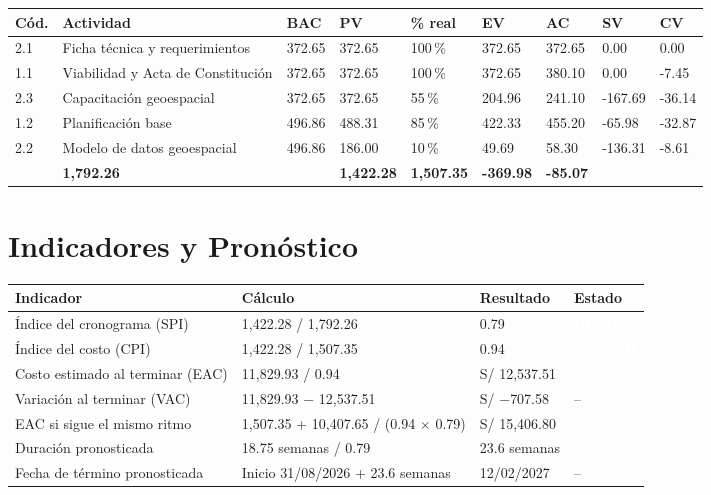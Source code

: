\documentclass[11pt,a4paper]{article}
\newcommand{\etiqueta}[2]{{\setlength{\fboxsep}{2pt}\colorbox{#1}{\textcolor{white}{\scriptsize\bfseries #2}}}}
\begin{document}
\vspace{0.1cm}
{\footnotesize
\setlength{\tabcolsep}{3pt}
\noindent\begin{tabularx}{\textwidth}{@{}C{0.7cm} L Q{1.3cm} Q{1.3cm} C{0.9cm} Q{1.3cm} Q{1.3cm} Q{1.3cm} Q{1.15cm}@{}}
\toprule
{}
\textbf{Cód.} & \textbf{Actividad} & \textbf{BAC} & \textbf{PV} & \textbf{\% real} & \textbf{EV} & \textbf{AC} & \textbf{SV} & \textbf{CV} \\
 & Ficha técnica y requerimientos & 372.65 & 372.65 & 100\,\% & 372.65 & 372.65 & 0.00 & 0.00 \\
1.1 & Viabilidad y Acta de Constitución & 372.65 & 372.65 & 100\,\% & 372.65 & 380.10 & 0.00 & \textcolor{SevAlta}{-7.45} \\
2.3 & Capacitación geoespacial & 372.65 & 372.65 & 55\,\% & 204.96 & 241.10 & \textcolor{SevAlta}{-167.69} & \textcolor{SevAlta}{-36.14} \\
1.2 & Planificación base & 496.86 & 488.31 & 85\,\% & 422.33 & 455.20 & \textcolor{SevAlta}{-65.98} & \textcolor{SevAlta}{-32.87} \\
2.2 & Modelo de datos geoespacial & 496.86 & 186.00 & 10\,\% & 49.69 & 58.30 & \textcolor{SevAlta}{-136.31} & \textcolor{SevAlta}{-8.61} \\
\midrule
{} & \textbf{1,792.26} & & \textbf{1,422.28} & \textbf{1,507.35} & \textbf{\textcolor{SevAlta}{-369.98}} & \textbf{\textcolor{SevAlta}{-85.07}} \\
\bottomrule
\end{tabularx}
}

\section{Indicadores y Pronóstico}
{\small
{}
\noindent\begin{tabularx}{\textwidth}{@{}P{4.6cm} L Q{2.3cm} C{1.6cm}@{}}
\toprule
{}
\textbf{Indicador} & \textbf{Cálculo} & \textbf{Resultado} & \textbf{Estado} \\
\midrule
Índice del cronograma (SPI) & 1,422.28 / 1,792.26 & 0.79 & \etiqueta{SevAlta}{ROJO} \\
Índice del costo (CPI) & 1,422.28 / 1,507.35 & 0.94 & \etiqueta{SevMedia}{ÁMBAR} \\
Costo estimado al terminar (EAC) & 11,829.93 / 0.94 & S/ 12,537.51 & \etiqueta{SevAlta}{ROJO} \\
Variación al terminar (VAC) & 11,829.93 $-$ 12,537.51 & S/ $-$707.58 & -- \\
EAC si sigue el mismo ritmo & 1,507.35 + 10,407.65 / (0.94 $\times$ 0.79) & S/ 15,406.80 & \etiqueta{SevAlta}{ROJO} \\
Duración pronosticada & 18.75 semanas / 0.79 & 23.6 semanas & \etiqueta{SevAlta}{ROJO} \\
Fecha de término pronosticada & Inicio 31/08/2026 + 23.6 semanas & 12/02/2027 & -- \\
\bottomrule
\end{tabularx}
}
\end{document}
